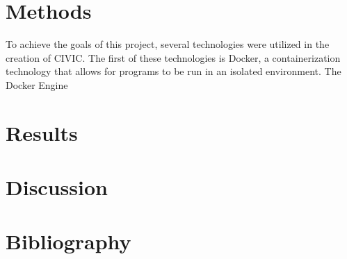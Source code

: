 \documentclass[11pt]{article}
\begin{document}
\section{Methods}

To achieve the goals of this project, several technologies were utilized in the creation of CIVIC. The first of these technologies is Docker, a containerization technology that allows for programs to be run in an isolated environment. The Docker Engine

\section{Results}

\section{Discussion}

\section{Bibliography}
\end{document}
